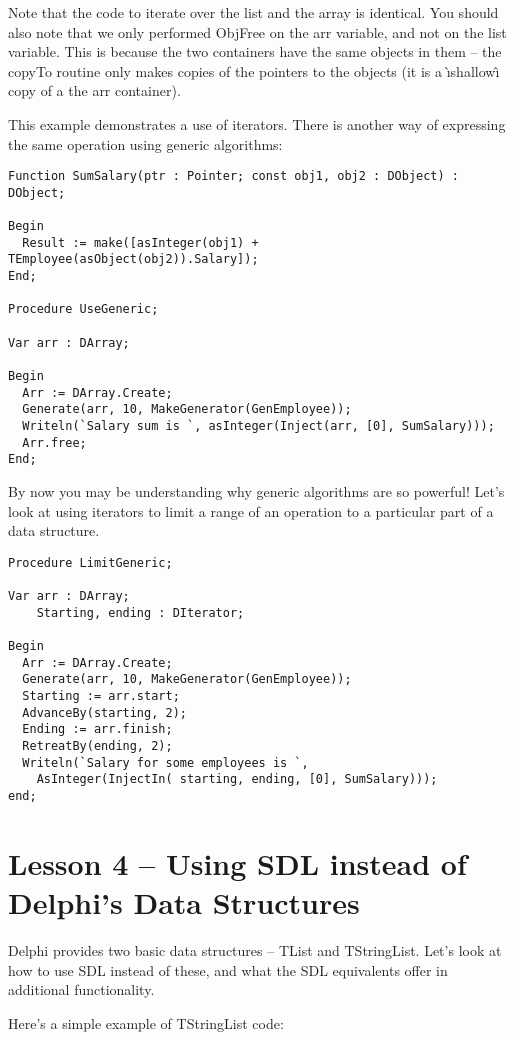 \documentclass{report}
\begin{document}
Note that the code to iterate over the list and the array is identical. You
should also note that we only performed ObjFree on the arr variable, and not
on the list variable. This is because the two containers have the same
objects in them -- the copyTo routine only makes copies of the pointers to
the objects (it is a \`{\i}shallow\^{\i} copy of a the arr container).

This example demonstrates a use of iterators. There is another 
way of expressing the same operation using generic algorithms:

\begin{lstlisting}
Function SumSalary(ptr : Pointer; const obj1, obj2 : DObject) : DObject;

Begin
  Result := make([asInteger(obj1) + TEmployee(asObject(obj2)).Salary]);
End;

Procedure UseGeneric;

Var arr : DArray;

Begin
  Arr := DArray.Create;
  Generate(arr, 10, MakeGenerator(GenEmployee));
  Writeln(`Salary sum is `, asInteger(Inject(arr, [0], SumSalary)));
  Arr.free;
End;
\end{lstlisting}

By now you may be understanding why generic algorithms 
are so powerful! Let's look at
using iterators to limit a range of an operation to a 
particular part of a data structure.

\begin{lstlisting}
Procedure LimitGeneric;

Var arr : DArray;
    Starting, ending : DIterator;

Begin
  Arr := DArray.Create;
  Generate(arr, 10, MakeGenerator(GenEmployee));
  Starting := arr.start;
  AdvanceBy(starting, 2);
  Ending := arr.finish;
  RetreatBy(ending, 2);
  Writeln(`Salary for some employees is `,
    AsInteger(InjectIn( starting, ending, [0], SumSalary)));
end;
\end{lstlisting}

\section{Lesson 4 -- Using SDL instead of Delphi's Data Structures}

Delphi provides two basic data structures -- TList and TStringList. Let's
look at how to use SDL instead of these, and what the SDL equivalents offer
in additional functionality.

Here's a simple example of TStringList code:
\end{document}
